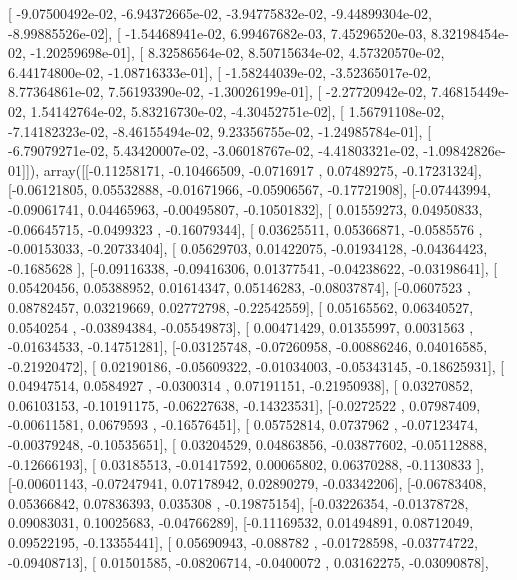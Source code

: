 \documentclass{article}
\begin{document}
       [ -9.07500492e-02,  -6.94372665e-02,  -3.94775832e-02,
         -9.44899304e-02,  -8.99885526e-02],
       [ -1.54468941e-02,   6.99467682e-03,   7.45296520e-03,
          8.32198454e-02,  -1.20259698e-01],
       [  8.32586564e-02,   8.50715634e-02,   4.57320570e-02,
          6.44174800e-02,  -1.08716333e-01],
       [ -1.58244039e-02,  -3.52365017e-02,   8.77364861e-02,
          7.56193390e-02,  -1.30026199e-01],
       [ -2.27720942e-02,   7.46815449e-02,   1.54142764e-02,
          5.83216730e-02,  -4.30452751e-02],
       [  1.56791108e-02,  -7.14182323e-02,  -8.46155494e-02,
          9.23356755e-02,  -1.24985784e-01],
       [ -6.79079271e-02,   5.43420007e-02,  -3.06018767e-02,
         -4.41803321e-02,  -1.09842826e-01]]), array([[-0.11258171, -0.10466509, -0.0716917 ,  0.07489275, -0.17231324],
       [-0.06121805,  0.05532888, -0.01671966, -0.05906567, -0.17721908],
       [-0.07443994, -0.09061741,  0.04465963, -0.00495807, -0.10501832],
       [ 0.01559273,  0.04950833, -0.06645715, -0.0499323 , -0.16079344],
       [ 0.03625511,  0.05366871, -0.0585576 , -0.00153033, -0.20733404],
       [ 0.05629703,  0.01422075, -0.01934128, -0.04364423, -0.1685628 ],
       [-0.09116338, -0.09416306,  0.01377541, -0.04238622, -0.03198641],
       [ 0.05420456,  0.05388952,  0.01614347,  0.05146283, -0.08037874],
       [-0.0607523 ,  0.08782457,  0.03219669,  0.02772798, -0.22542559],
       [ 0.05165562,  0.06340527,  0.0540254 , -0.03894384, -0.05549873],
       [ 0.00471429,  0.01355997,  0.0031563 , -0.01634533, -0.14751281],
       [-0.03125748, -0.07260958, -0.00886246,  0.04016585, -0.21920472],
       [ 0.02190186, -0.05609322, -0.01034003, -0.05343145, -0.18625931],
       [ 0.04947514,  0.0584927 , -0.0300314 ,  0.07191151, -0.21950938],
       [ 0.03270852,  0.06103153, -0.10191175, -0.06227638, -0.14323531],
       [-0.0272522 ,  0.07987409, -0.00611581,  0.0679593 , -0.16576451],
       [ 0.05752814,  0.0737962 , -0.07123474, -0.00379248, -0.10535651],
       [ 0.03204529,  0.04863856, -0.03877602, -0.05112888, -0.12666193],
       [ 0.03185513, -0.01417592,  0.00065802,  0.06370288, -0.1130833 ],
       [-0.00601143, -0.07247941,  0.07178942,  0.02890279, -0.03342206],
       [-0.06783408,  0.05366842,  0.07836393,  0.035308  , -0.19875154],
       [-0.03226354, -0.01378728,  0.09083031,  0.10025683, -0.04766289],
       [-0.11169532,  0.01494891,  0.08712049,  0.09522195, -0.13355441],
       [ 0.05690943, -0.088782  , -0.01728598, -0.03774722, -0.09408713],
       [ 0.01501585, -0.08206714, -0.0400072 ,  0.03162275, -0.03090878],
\end{document}
